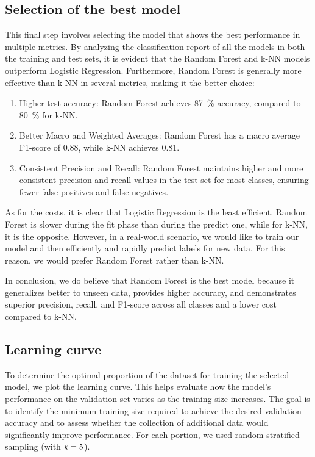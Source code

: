 \documentclass[acmlarge,nonacm]{acmart}
\begin{document}
\subsection{Selection of the best model}
This final step involves selecting the model that shows the best performance in multiple metrics. By analyzing the classification report of all the models in both the training and test sets, it is evident that the Random Forest and k-NN models outperform Logistic Regression. Furthermore, Random Forest is generally more effective than k-NN in several metrics, making it the better choice:
\begin{enumerate}
    \item Higher test accuracy: Random Forest achieves \SI{87}{\percent} accuracy, compared to \SI{80}{\percent} for k-NN.
    \item Better Macro and Weighted Averages: Random Forest has a macro average F1-score of 0.88, while k-NN achieves 0.81.
    \item Consistent Precision and Recall: Random Forest maintains higher and more consistent precision and recall values in the test set for most classes, ensuring fewer false positives and false negatives.
\end{enumerate}

As for the costs, it is clear that Logistic Regression is the least efficient. Random Forest is slower during the fit phase than during the predict one, while for k-NN, it is the opposite. However, in a real-world scenario, we would like to train our model and then efficiently and rapidly predict labels for new data. For this reason, we would prefer Random Forest rather than k-NN.

In conclusion, we do believe that Random Forest is the best model because it generalizes better to unseen data, provides higher accuracy, and demonstrates superior precision, recall, and F1-score across all classes and a lower cost compared to k-NN. 

\subsection{Learning curve}
To determine the optimal proportion of the dataset for training the selected model, we plot the learning curve. This helps evaluate how the model's performance on the validation set varies as the training size increases. The goal is to identify the minimum training size required to achieve the desired validation accuracy and to assess whether the collection of additional data would significantly improve performance. For each portion, we used random stratified sampling (with $\emph{k}=5$).
\end{document}
